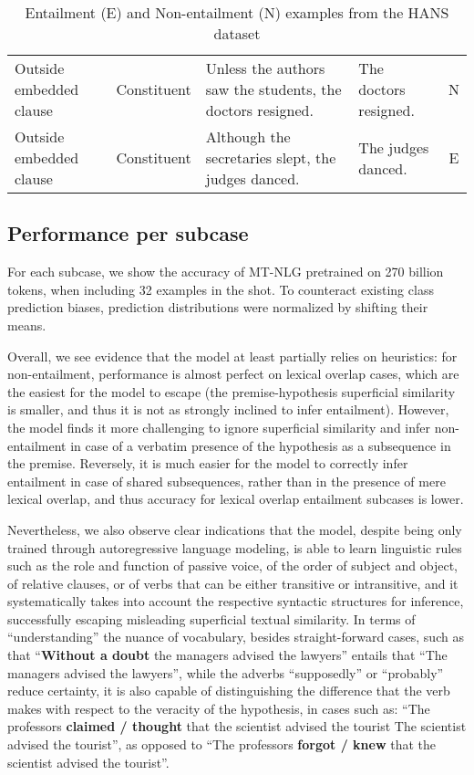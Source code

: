 \documentclass[11pt]{article}
\begin{document}
\begin{table}[]
\begin{adjustbox}{width=1.1\textwidth}
\begin{tabular}{@{}lcllc@{}}
Outside embedded clause              & Constituent        & Unless the authors saw the students, the doctors resigned. & The doctors resigned.                   & N              \\
Outside embedded clause              & Constituent        & Although the secretaries slept, the judges danced.         & The judges danced.                      & E             \\
\bottomrule
\end{tabular}
\end{adjustbox}
\caption{Entailment (E) and Non-entailment (N) examples from the HANS dataset}
\label{tab:hans_examples}
\end{table}


\subsection{Performance per subcase}

For each subcase, we show the accuracy of MT-NLG pretrained on 270 billion tokens, when including 32 examples in the shot. To counteract existing class prediction biases, prediction distributions were normalized by shifting their means.

Overall, we see evidence that the model at least partially relies on heuristics: for non-entailment, performance is almost perfect on lexical overlap cases, which are the easiest for the model to escape (the premise-hypothesis superficial similarity is smaller, and thus it is not as strongly inclined to infer entailment). However, the model finds it more challenging to ignore superficial similarity and infer non-entailment in case of a verbatim presence of the hypothesis as a subsequence in the premise. Reversely, it is much easier for the model to correctly infer entailment in case of shared subsequences, rather than in the presence of mere lexical overlap, and thus accuracy for lexical overlap entailment subcases is lower.

Nevertheless, we also observe clear indications that the model, despite being only trained through autoregressive language modeling, is able to learn linguistic rules such as the role and function of passive voice, of the order of subject and object, of relative clauses, or of verbs that can be either transitive or intransitive, and it systematically takes into account the respective syntactic structures for inference, successfully escaping misleading superficial textual similarity. In terms of ``understanding'' the nuance of vocabulary, besides straight-forward cases, such as that ``\textbf{Without a doubt} the managers advised the lawyers'' entails that ``The managers advised the lawyers'', while the adverbs ``supposedly'' or ``probably'' reduce certainty, it is also capable of distinguishing the difference that the verb makes with respect to the veracity of the hypothesis, in cases such as: ``The professors \textbf{claimed / thought} that the scientist advised the tourist  The scientist advised the tourist'', as opposed to ``The professors \textbf{forgot / knew} that the scientist advised the tourist''.
\end{document}
